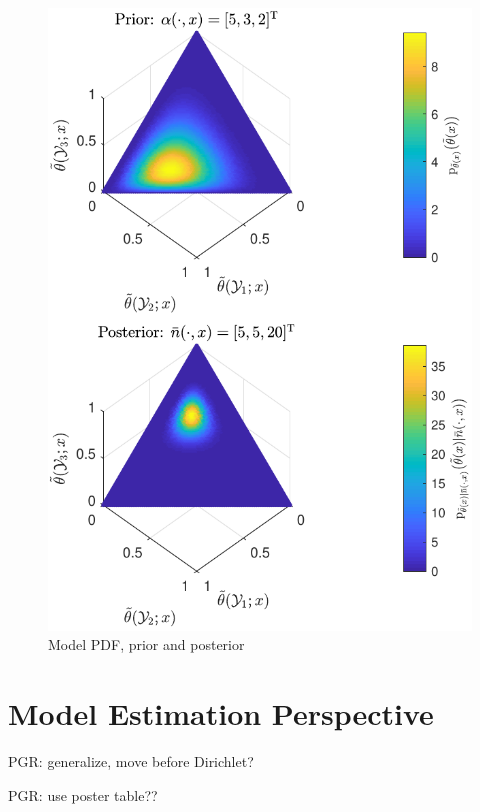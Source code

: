 \documentclass[12pt]{report}
\begin{document}
\begin{figure}
\centering
\includegraphics[width=0.7\linewidth]{P_theta_post_tilde.pdf}
\caption{Model PDF, prior and posterior}
\end{figure}





\section{Model Estimation Perspective} \label{sec:predictive_est}

PGR: generalize, move before Dirichlet?

PGR: use poster table??
\end{document}
